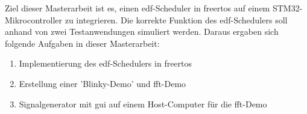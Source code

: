 \documentclass[../EDF Master Thesis.tex]{subfiles}
\begin{document}
    Ziel dieser Masterarbeit ist es, einen \ac{edf}-Scheduler in \ac{freertos} auf einem STM32-Mikrocontroller zu integrieren.
    Die korrekte Funktion des \ac{edf}-Schedulers soll anhand von zwei Testanwendungen simuliert werden.
    Daraus ergaben sich folgende Aufgaben in dieser Masterarbeit:
    \begin{enumerate}
        \item Implementierung des \ac{edf}-Schedulers in \ac{freertos}
        \item Erstellung einer 'Blinky-Demo' und \ac{fft}-Demo
    \item Signalgenerator mit \ac{gui} auf einem Host-Computer für die \ac{fft}-Demo
    \end{enumerate}
\end{document}
